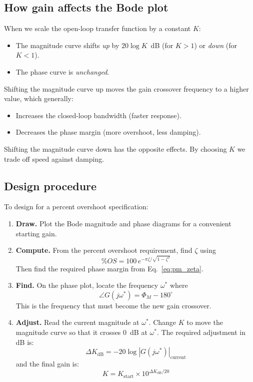 \documentclass[../../book.tex]{subfiles}
\begin{document}
\subsection{How gain affects the Bode plot}
\label{sec:gain_effect}

When we scale the open-loop transfer function by a constant $K$:
\begin{itemize}
  \item The magnitude curve shifts \emph{up} by $20\log K$~dB (for $K > 1$)
    or \emph{down} (for $K < 1$).
  \item The phase curve is \emph{unchanged}.
\end{itemize}

Shifting the magnitude curve up moves the gain crossover frequency to a
higher value, which generally:
\begin{itemize}
  \item Increases the closed-loop bandwidth (faster response).
  \item Decreases the phase margin (more overshoot, less damping).
\end{itemize}
Shifting the magnitude curve down has the opposite effects.  By choosing $K$
we trade off speed against damping.

\subsection{Design procedure}
\label{sec:procedure}

To design for a percent overshoot specification:

\begin{enumerate}
  \item \textbf{Draw.}  Plot the Bode magnitude and phase diagrams for a
    convenient starting gain.
  \item \textbf{Compute.}  From the percent overshoot requirement, find $\zeta$
    using
    \[
      \%OS = 100\,e^{-\pi\zeta/\sqrt{1-\zeta^2}}
    \]
    Then find the required phase margin from Eq.~\eqref{eq:pm_zeta}.
  \item \textbf{Find.}  On the phase plot, locate the frequency $\omega^*$
    where
    \[
      \angle G(j\omega^*) = \Phi_M - 180^\circ
    \]
    This is the frequency that must become the new gain crossover.
  \item \textbf{Adjust.}  Read the current magnitude at $\omega^*$.  Change
    $K$ to move the magnitude curve so that it crosses 0~dB at $\omega^*$.
    The required adjustment in dB is:
    \[
      \Delta K_{\mathrm{dB}} = -20\log|G(j\omega^*)|_{\mathrm{current}}
    \]
    and the final gain is:
    \[
      K = K_{\mathrm{start}} \times 10^{\Delta K_{\mathrm{dB}}/20}
    \]
\end{enumerate}
\end{document}
